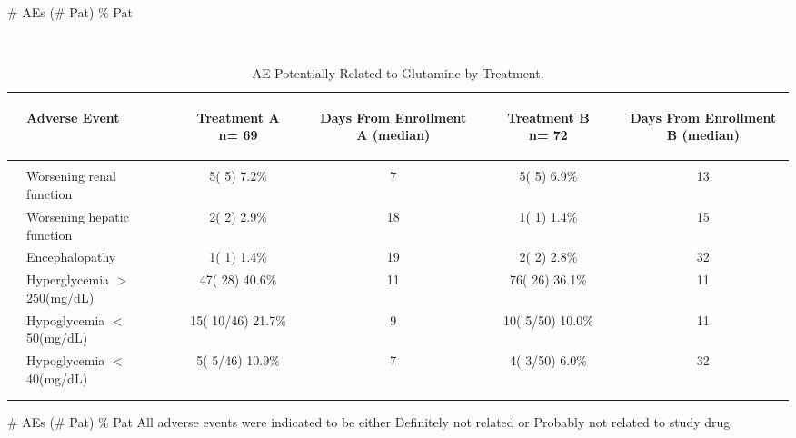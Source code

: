 \documentclass[dvips, 10pt]{article}
\begin{document}
\begin{table}[t]
\begin{center}
\begin{tabular}{ @{}l@{}
@{}l@{}@{}p{1.5em}@{}@{}c@{}@{}p{1.5em}@{}@{}c@{}@{}p{1.5em}@{}@{}c@{}@{}p{1.5em}@{}@{}c@{}
}
\end{tabular}


\parbox{ 5in }{ \# AEs (\# Pat) \% Pat } \\
 \vspace{1em}\end{center}
 \end{table}
\begin{table}[t]
\caption
{ AE Potentially Related to Glutamine by Treatment. }
\begin{center}
\begin{tabular}{ @{}l@{}
@{}l@{}@{}p{1.5em}@{}@{}c@{}@{}p{1.5em}@{}@{}c@{}@{}p{1.5em}@{}@{}c@{}@{}p{1.5em}@{}@{}c@{}
}
\hline

& \parbox{6em}{\begin{center}Adverse Event\end{center}} && \parbox{6em}{\begin{center}Treatment A n= 69\end{center}} && \parbox{6em}{\begin{center}Days From Enrollment A (median)\end{center}} && \parbox{6em}{\begin{center}Treatment B n= 72\end{center}} && \parbox{6em}{\begin{center}Days From Enrollment B (median)\end{center}} \\

\hline

\\
& Worsening renal function && 5(  5)  7.2\% && 7 && 5(  5)  6.9\% && 13 \\
& Worsening hepatic function && 2(  2)  2.9\% && 18 && 1(  1)  1.4\% && 15 \\
& Encephalopathy && 1(  1)  1.4\% && 19 && 2(  2)  2.8\% && 32 \\
& Hyperglycemia $>$250(mg/dL) && 47( 28) 40.6\% && 11 && 76( 26) 36.1\% && 11 \\
& Hypoglycemia $<$50(mg/dL) && 15( 10/46) 21.7\% && 9 && 10(  5/50) 10.0\% && 11 \\
& Hypoglycemia $<$40(mg/dL) && 5(  5/46) 10.9\% && 7 && 4(  3/50)  6.0\% && 32 \\
\\
\hline \\

\end{tabular}


\parbox{ 5in }{ \# AEs (\# Pat) \% Pat \newline \newline \newline All adverse events were indicated to be either Definitely not related or Probably not related 
 to study drug } \\
 \vspace{1em}\end{center}
 \end{table}
\end{document}
